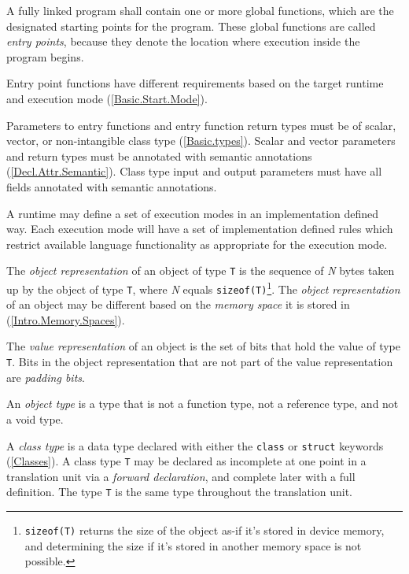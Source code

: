 
\p A fully linked program shall contain one or more global functions, which are
the designated starting points for the program. These global functions are
called \textit{entry points}, because they denote the location where execution
inside the program begins.

\p Entry point functions have different requirements based on the target runtime
and execution mode (\ref{Basic.Start.Mode}).

\p Parameters to entry functions and entry function return types must be of
scalar, vector, or non-intangible class type (\ref{Basic.types}). Scalar and
vector parameters and return types must be annotated with semantic annotations
(\ref{Decl.Attr.Semantic}). Class type input and output parameters must have all
fields annotated with semantic annotations.


\p A runtime may define a set of execution modes in an implementation defined
way. Each execution mode will have a set of implementation defined rules which
restrict available language functionality as appropriate for the execution mode.


\p The \textit{object representation} of an object of type \texttt{T} is the
sequence of \textit{N} bytes taken up by the object of type \texttt{T}, where
\textit{N} equals \texttt{sizeof(T)}\footnote{\texttt{sizeof(T)} returns the
size of the object as-if it's stored in device memory, and determining the size
if it's stored in another memory space is not possible.}. The \textit{object
representation} of an object may be different based on the \textit{memory space}
it is stored in (\ref{Intro.Memory.Spaces}).

\p The \textit{value representation} of an object is the set of bits that hold
the value of type \texttt{T}. Bits in the object representation that are not
part of the value representation are \textit{padding bits}.

\p An \textit{object type} is a type that is not a function type, not a
reference type, and not a void type.

\p A \textit{class type} is a data type declared with either the \texttt{class}
or \texttt{struct} keywords (\ref{Classes}). A class type \texttt{T} may be
declared as incomplete at one point in a translation unit via a \textit{forward
declaration}, and complete later with a full definition. The type \texttt{T} is
the same type throughout the translation unit.

